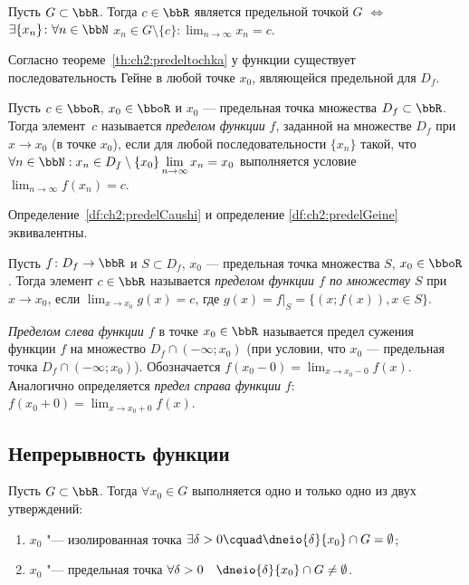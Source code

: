 \begin{thm}
\label{th:ch2:predeltochka}
Пусть $G \subset \bbR$. Тогда $c \in \bbR$ является предельной точкой $G$ $\Longleftrightarrow$ $ \exists \{x_n\}\colon \forall n \in \bbN$ $x_n \in G\setminus\{c\}\colon \lim_{n \to \infty}\limits x_n = c$. 
\end{thm}

Согласно теореме~\ref{th:ch2:predeltochka} у функции существует последовательность Гейне в любой точке $x_0$, являющейся предельной для $D_f$.

\begin{defn}\label{df:ch2:predelGeine}
Пусть $c\in\bboR$, $x_0 \in \bboR$ и $x_0$ --- предельная точка множества $D_f \subset \bbR$. Тогда элемент~$c$ называется \textit{пределом функции} $f$, заданной на множестве $D_f$ при $x \to x_0$ (в точке $x_0$), если для любой последовательности $\{x_n\}$ такой, что $\forall n \in \bbN: x_n\in D_f\setminus \{x_0\} \lim_{n \to \infty}\limits x_n = x_0$ выполняется условие $\lim_{n \to \infty}\limits f(x_n) = c$. 
\end{defn}

\begin{thm}
Определение~\ref{df:ch2:predelCaushi} и определение \ref{df:ch2:predelGeine} эквивалентны.
\end{thm}

\begin{defn}
Пусть $f\colon D_f \to \bbR$ и $S \subset D_f$, $x_0$ --- предельная точка множества $S$, $x_0 \in \bboR$. Тогда элемент $c \in \bbR$ называется \textit{пределом функции $f$ по множеству $S$} при $x \to x_0$, если $\lim_{x \to x_0}\limits g(x) = c$, где $g(x)=\left.f\right|_S = \{(x;f(x)),x \in S\}$.
\end{defn}

\begin{defn}
\textit{Пределом слева функции $f$} в точке $x_0 \in \bbR$ называется предел сужения функции $f$ на множество $D_f \cap (-\infty;x_0)$ (при условии, что  $x_0$ --- предельная точка $D_f \cap (-\infty;x_0)$). Обозначается $f(x_0-0)=\lim_{x \to x_0-0}\limits f(x)$.
Аналогично определяется \textit{предел справа функции} $f$: $f(x_0+0)=\lim_{x \to x_0+0}\limits f(x)$. 
\end{defn}

\subsection{Непрерывность функции}
Пусть $G \subset \bbR$. Тогда $\forall x_0 \in G$ выполняется одно и только одно из двух утверждений:
\begin{enumerate}
\item $x_0$ "--- изолированная точка $\exists \delta>0\cquad \dneio{\delta}{x_0} \cap G = \emptyset$;
\item $x_0$ "--- предельная точка $\forall \delta > 0\quad \dneio{\delta}{x_0}\cap G \neq \emptyset$.
\end{enumerate}

